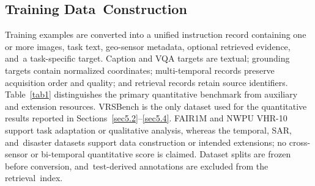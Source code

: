 \documentclass[applsci,article,accept,moreauthors]{Definitions/mdpi}
\begin{document}
\subsection{Training Data~Construction}

Training examples are converted into a unified instruction record containing one or more images, task text, geo-sensor metadata, optional retrieved evidence, and~a task-specific target. Caption and VQA targets are textual; grounding targets contain normalized coordinates; multi-temporal records preserve acquisition order and quality; and retrieval records retain source identifiers. Table~\ref{tab1} distinguishes the primary quantitative benchmark from auxiliary and extension resources. VRSBench is the only dataset used for the quantitative results reported in Sections~\ref{sec5.2}--\ref{sec5.4}. FAIR1M \citep{ref1} and NWPU VHR-10 support task adaptation or qualitative analysis, whereas the temporal, SAR, and~disaster datasets support data construction or intended extensions; no cross-sensor or bi-temporal quantitative score is claimed. Dataset splits are frozen before conversion, and~test-derived annotations are excluded from the retrieval~index.
\end{document}
